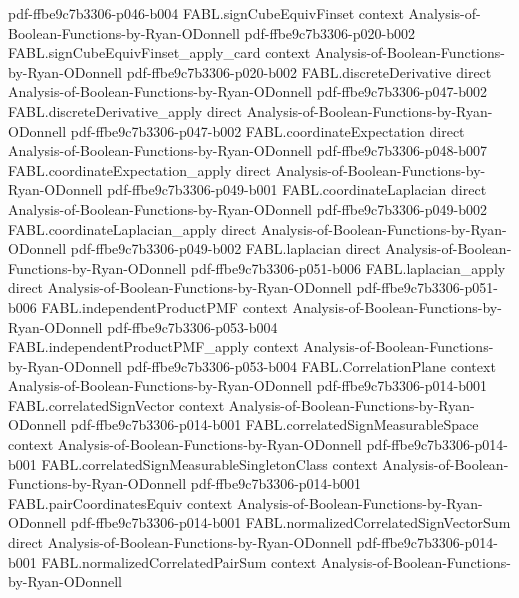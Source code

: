 \begin{theorem}
  {pdf-ffbe9c7b3306-p046-b004}
\proofstep
  {FABL.signCubeEquivFinset}
  {context}
  {Analysis-of-Boolean-Functions-by-Ryan-ODonnell}
  {pdf-ffbe9c7b3306-p020-b002}
\proofstep
  {FABL.signCubeEquivFinset_apply_card}
  {context}
  {Analysis-of-Boolean-Functions-by-Ryan-ODonnell}
  {pdf-ffbe9c7b3306-p020-b002}
\proofstep
  {FABL.discreteDerivative}
  {direct}
  {Analysis-of-Boolean-Functions-by-Ryan-ODonnell}
  {pdf-ffbe9c7b3306-p047-b002}
\proofstep
  {FABL.discreteDerivative_apply}
  {direct}
  {Analysis-of-Boolean-Functions-by-Ryan-ODonnell}
  {pdf-ffbe9c7b3306-p047-b002}
\proofstep
  {FABL.coordinateExpectation}
  {direct}
  {Analysis-of-Boolean-Functions-by-Ryan-ODonnell}
  {pdf-ffbe9c7b3306-p048-b007}
\proofstep
  {FABL.coordinateExpectation_apply}
  {direct}
  {Analysis-of-Boolean-Functions-by-Ryan-ODonnell}
  {pdf-ffbe9c7b3306-p049-b001}
\proofstep
  {FABL.coordinateLaplacian}
  {direct}
  {Analysis-of-Boolean-Functions-by-Ryan-ODonnell}
  {pdf-ffbe9c7b3306-p049-b002}
\proofstep
  {FABL.coordinateLaplacian_apply}
  {direct}
  {Analysis-of-Boolean-Functions-by-Ryan-ODonnell}
  {pdf-ffbe9c7b3306-p049-b002}
\proofstep
  {FABL.laplacian}
  {direct}
  {Analysis-of-Boolean-Functions-by-Ryan-ODonnell}
  {pdf-ffbe9c7b3306-p051-b006}
\proofstep
  {FABL.laplacian_apply}
  {direct}
  {Analysis-of-Boolean-Functions-by-Ryan-ODonnell}
  {pdf-ffbe9c7b3306-p051-b006}
\proofstep
  {FABL.independentProductPMF}
  {context}
  {Analysis-of-Boolean-Functions-by-Ryan-ODonnell}
  {pdf-ffbe9c7b3306-p053-b004}
\proofstep
  {FABL.independentProductPMF_apply}
  {context}
  {Analysis-of-Boolean-Functions-by-Ryan-ODonnell}
  {pdf-ffbe9c7b3306-p053-b004}
\proofstep
  {FABL.CorrelationPlane}
  {context}
  {Analysis-of-Boolean-Functions-by-Ryan-ODonnell}
  {pdf-ffbe9c7b3306-p014-b001}
\proofstep
  {FABL.correlatedSignVector}
  {context}
  {Analysis-of-Boolean-Functions-by-Ryan-ODonnell}
  {pdf-ffbe9c7b3306-p014-b001}
\proofstep
  {FABL.correlatedSignMeasurableSpace}
  {context}
  {Analysis-of-Boolean-Functions-by-Ryan-ODonnell}
  {pdf-ffbe9c7b3306-p014-b001}
\proofstep
  {FABL.correlatedSignMeasurableSingletonClass}
  {context}
  {Analysis-of-Boolean-Functions-by-Ryan-ODonnell}
  {pdf-ffbe9c7b3306-p014-b001}
\proofstep
  {FABL.pairCoordinatesEquiv}
  {context}
  {Analysis-of-Boolean-Functions-by-Ryan-ODonnell}
  {pdf-ffbe9c7b3306-p014-b001}
\proofstep
  {FABL.normalizedCorrelatedSignVectorSum}
  {direct}
  {Analysis-of-Boolean-Functions-by-Ryan-ODonnell}
  {pdf-ffbe9c7b3306-p014-b001}
\proofstep
  {FABL.normalizedCorrelatedPairSum}
  {context}
  {Analysis-of-Boolean-Functions-by-Ryan-ODonnell}

\end{theorem}
